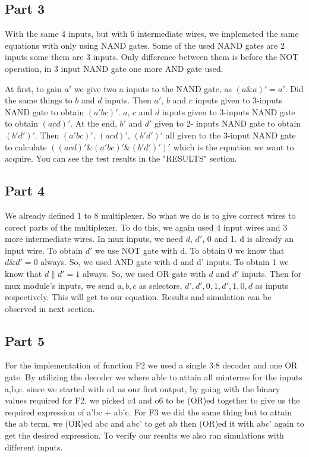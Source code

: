 \documentclass[pdftex,12pt,a4paper]{article}
\begin{document}
\subsection{Part 3}

With the same 4 inputs, but with 6 intermediate wires, we implemeted the same equations with only using NAND gates. Some of the used NAND gates are 2 inputs some them are 3 inputs. Only difference between them is before the NOT operation, in 3 input NAND gate one more AND gate used. 

At first, to gain $a'$ we give two a inputs to the NAND gate, as $(a\&a)'=a'$. Did the same things to $b$ and $d$ inputs. Then $a'$, $b$ and $c$ inputs given to 3-inputs NAND gate to obtain $(a'bc)'$. $a$, $c$ and $d$ inputs given to 3-inputs NAND gate to obtain $(acd)'$. At the end, $b'$ and $d'$ given to 2- inputs NAND gate to obtain $(b'd')'$. Then $(a'bc)'$, $(acd)'$,  $(b'd')'$ all given to the 3-input NAND gate to calculate  $((acd)' \& (a'bc)' \& (b' d')')'$ which is the equation we want to acquire. You can see the test results in the "RESULTS" section.


\subsection{Part 4}

We already defined 1 to 8 multiplexer. So what we do is to give correct wires to corect parts of the multiplexer. To do this, we again used 4 input wires and 3 more intermediate wires. In mux inputs, we need $d$, $d'$, 0 and 1. d is already an input wire. To obtain $d'$ we use NOT gate with d. To obtain 0 we know that $d\&d'=0$ always. So, we used AND gate with d and d' inputs. To obtain 1 we know that $d\|d'=1$ always. So, we used OR gate with $d$ and $d'$ inputs. Then for mux module's inputs, we send $a,b,c$ as selectors, $d',d',0,1,d',1,0,d$ as inputs respectively. This will get to our equation. Results and simulation can be observed in next section.



\subsection{Part 5}
For the implementation of function F2 we used a single 3:8 decoder and one OR gate. By utilizing the decoder we where able to attain all minterms for the inputs a,b,c. since we started with o1 as our first output, by going with the binary values required for F2, we picked o4 and o6 to be (OR)ed together to give us the required expression of a'bc + ab'c.
For F3 we did the same thing but to attain the ab term, we (OR)ed abc and abc' to get ab then (OR)ed it with abc' again to get the desired expression. To verify our results we also ran simulations with different inputs.
\end{document}
